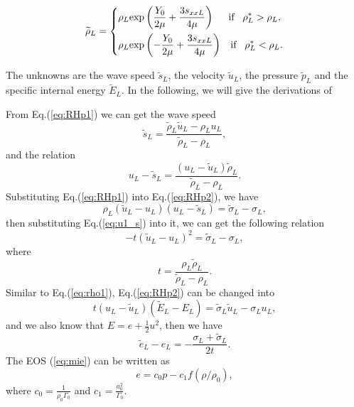 \documentclass{article}
\numberwithin{equation}{section}
\numberwithin{table}{section}
\begin{document}
\begin{equation}   \widetilde{\rho}_{L} = \left\{ \begin{aligned}
	  & \rho_L \text{exp}\left(\frac{Y_0}{2\mu}+\frac{3 s_{xxL}}{4\mu}\right)  \hspace{0.5cm} \text{if} \hspace{0.3cm} \rho_L^* > \rho_L,\\
& \rho_L \text{exp}\left(-\frac{Y_0}{2\mu}+\frac{3 s_{xxL}}{4\mu}\right)
\hspace{0.3cm} \text{if} \hspace{0.3cm} \rho_L^* < \rho_L.\\
  \end{aligned}\right.
 \end{equation}

 The unknowns are the wave speed $\widetilde{s}_L$,  the velocity  $\widetilde{u}_L$, the pressure $\widetilde{p}_L$ and the specific internal energy $\widetilde{E}_L$. In the following, we will give the derivations of

 From Eq.(\ref{eq:RHp1}) we can get the wave speed
  \begin{equation}
	\widetilde{s}_L = \frac{\widetilde{\rho}_L \widetilde{u}_L-\rho_Lu_L}{\widetilde{\rho}_L-\rho_L},
  \end{equation}
and the relation
\begin{equation}\label{eq:u1_s}
  u_L-\widetilde{s}_L = \frac{(u_L-\widetilde{u}_L)\widetilde{\rho}_L}{\widetilde{\rho}_L-\rho_L}.
\end{equation}
Substituting Eq.(\ref{eq:RHp1}) into Eq.(\ref{eq:RHp2}), we have
\begin{equation}\label{eq:rho1}
  \rho_L(\widetilde{u}_L - u_L)(u_L-\widetilde{s}_L) = \widetilde{\sigma}_L -\sigma_L,
\end{equation}
then substituting Eq.(\ref{eq:u1_s}) into it, we can get the following relation
\begin{equation}\label{eq:tu_2}
  -t(\widetilde{u}_L-u_L)^2 = \widetilde{\sigma}_L-\sigma_L,
\end{equation}
where
\begin{equation}
t=\frac{\rho_L \widetilde{\rho}_L}{\widetilde{\rho}_L-\rho_L}.
\end{equation}
Similar to Eq.(\ref{eq:rho1}), Eq.(\ref{eq:RHp2}) can be changed into
\begin{equation}
  t(u_L-\widetilde{u}_L)(\widetilde{E}_L-E_L) =\widetilde{\sigma}_L\widetilde{u}_L-\sigma_Lu_L,
\end{equation}
and we also know that $E = e+\frac{1}{2}u^2$, then we have
\begin{equation}\label{eq:e21}
  \widetilde{e}_L-e_L= -\frac{\sigma_L+\widetilde{\sigma}_L}{2t}.
\end{equation}
The EOS (\ref{eq:mie}) can be written as
\begin{equation} \label{eq:eos1}
  e=c_0 p-c_1f(\rho/\rho_0),
\end{equation}
where $c_0=\frac{1}{\rho_0\Gamma_0}$ and $c_1=\frac{a_0^2}{\Gamma_0}$.
\end{document}
